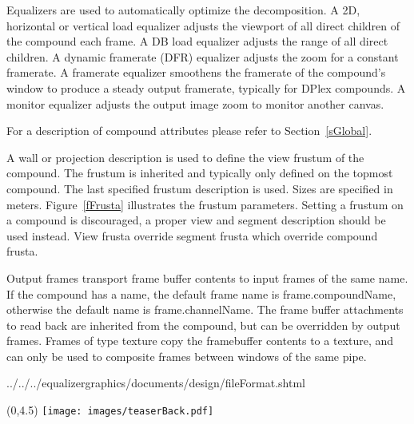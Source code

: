 \documentclass[10pt,a4]{scrartcl}
\newcommand{\fig}[1]{Figure~\ref{#1}}
\newcommand{\sref}[1]{Section~\ref{#1}}
\begin{document}
Equalizers are used to automatically optimize the decomposition. A 2D,
horizontal or vertical load equalizer adjusts the viewport of all direct
children of the compound each frame. A DB load equalizer adjusts the
range of all direct children. A dynamic framerate (DFR) equalizer adjusts
the zoom for a constant framerate. A framerate equalizer
smoothens the framerate of the compound's window to produce a steady
output framerate, typically for DPlex compounds. A monitor equalizer
adjusts the output image zoom to monitor another canvas.

For a description of compound attributes please refer to \sref{sGlobal}.

A wall or projection description is used to define the view frustum of
the compound. The frustum is inherited and typically only defined on the
topmost compound. The last specified frustum description is used. Sizes
are specified in meters. \fig{fFrusta} illustrates the frustum
parameters. Setting a frustum on a compound is discouraged, a proper view and
segment description should be used instead. View frusta override segment frusta
which override compound frusta.

Output frames transport frame buffer contents to input frames of the
same name. If the compound has a name, the default frame name is
\textsf{frame.compoundName}, otherwise the default name is
\textsf{frame.channelName}. The frame buffer attachments to read back
are inherited from the compound, but can be overridden by output
frames. Frames of type \textsf{texture} copy the framebuffer contents to
a texture, and can only be used to composite frames between windows of
the same pipe.

{\footnotesize
  {../../../equalizergraphics/documents/design/fileFormat.shtml}}

\cleardoublepage
\pagestyle{empty}
\begin{textblock}{}(0,4.5)
  \hspace{-1cm}\texttt{[image: images/teaserBack.pdf]}
\end{textblock}
\end{document}
